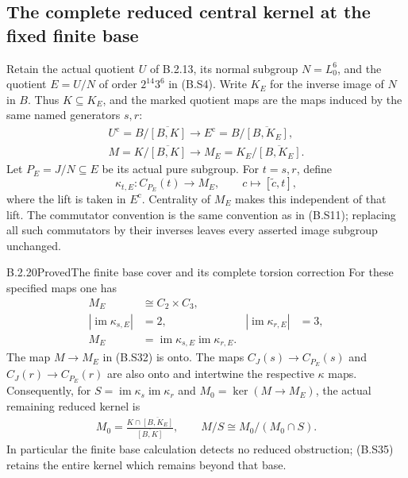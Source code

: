 \subsection{The complete reduced central kernel at the fixed finite base}

Retain the actual quotient $U$ of B.2.13, its normal
subgroup $N=L_0^6$, and the quotient
$E=U/N$ of order $2^{14}3^6$ in (B.S4).
Write $K_E$ for the inverse image of $N$ in $B$.
Thus $K\subseteq K_E$, and the marked quotient maps are
the maps induced by the same named generators $s,r$:
\[
\begin{gathered}
 U^{\mathrm c}=B/\overline{[B,K]}
       \longrightarrow E^{\mathrm c}
          =B/\overline{[B,K_E]},\\
 M=K/\overline{[B,K]}
       \longrightarrow M_E=K_E/\overline{[B,K_E]}.
\end{gathered}                                                   \tag{B.S32}
\]
Let $P_E=J/N\subseteq E$ be its actual pure subgroup.
For $t=s,r$, define
\[
 \kappa_{t,E}:C_{P_E}(t)\longrightarrow M_E,
       \qquad c\longmapsto[\widetilde c,t],                    \tag{B.S33}
\]
where the lift is taken in $E^{\mathrm c}$.  Centrality
of $M_E$ makes this independent of that lift.  The
commutator convention is the same convention as in
(B.S11); replacing all such commutators by their
inverses leaves every asserted image subgroup unchanged.

\begin{result}{B.2.20}{Proved}{The finite base cover and its complete torsion correction}
For these specified maps one has
\[
\begin{aligned}
 M_E&\cong C_2\times C_3,\\
 |\operatorname{im}\kappa_{s,E}|&=2,
       &|\operatorname{im}\kappa_{r,E}|&=3,\\
 M_E&=\operatorname{im}\kappa_{s,E}
                         \operatorname{im}\kappa_{r,E}.
\end{aligned}                                                   \tag{B.S34}
\]
The map $M\to M_E$ in (B.S32) is onto.  The maps
$C_J(s)\to C_{P_E}(s)$ and
$C_J(r)\to C_{P_E}(r)$ are also onto and intertwine
the respective $\kappa$ maps.  Consequently, for
$S=\operatorname{im}\kappa_s\operatorname{im}\kappa_r$
and $M_0=\ker(M\to M_E)$, the actual remaining reduced
kernel is
\[
\begin{gathered}
 M_0=\frac{K\cap\overline{[B,K_E]}}
                      {\overline{[B,K]}},\qquad
 M/S\cong M_0/(M_0\cap S).                                    \tag{B.S35}
\end{gathered}
\]
In particular the finite base calculation detects no
reduced obstruction; (B.S35) retains the entire kernel
which remains beyond that base.
\end{result}

